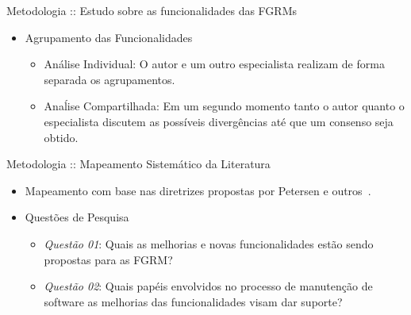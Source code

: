 \documentclass[t,14pt,mathserif]{beamer}
\begin{document}
\begin{frame}{Metodologia :: Estudo sobre as funcionalidades das FGRMs}
    \begin{itemize}
        \item Agrupamento das Funcionalidades
            \begin{itemize}
                \item Análise Individual: O autor e um outro especialista
                    realizam de forma separada os agrupamentos.
                \item Anaĺise Compartilhada: Em um segundo momento tanto o autor
                    quanto o es\-pe\-ci\-a\-lis\-ta discutem as possíveis
                    divergências até que um consenso seja obtido.
            \end{itemize}
    \end{itemize}
\end{frame}

\begin{frame}{Metodologia :: Mapeamento Sistemático da Literatura}

    \begin{itemize}
        \item Mapeamento com base nas diretrizes propostas por Petersen e
            outros~\cite{Petersen2008}.
        \item Questões de Pesquisa
            \begin{itemize}
                \item \textit{Questão 01}: Quais as melhorias e novas
                funcionalidades estão sendo propostas para as FGRM\@?
                \item \textit{Questão 02}: Quais papéis envolvidos no processo de
                    manutenção de software as melhorias das funcionalidades visam
                    dar suporte?
            \end{itemize}
    \end{itemize}

\end{frame}
\end{document}
